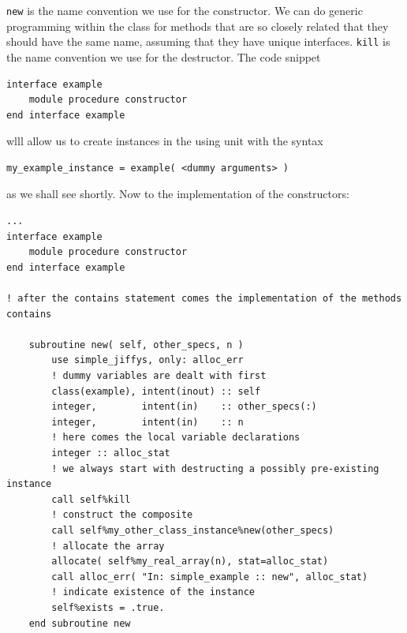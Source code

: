 \documentclass[a4paper,11pt]{article}
\begin{document}
\texttt{new} is the name convention we use for the constructor. We can do generic programming within the class for methods that are so closely related that they should have the same name, assuming that they have unique interfaces. \texttt{kill} is the name convention we use for the destructor. The  code snippet
\begin{verbatim}
interface example
    module procedure constructor
end interface example
\end{verbatim}
wlll allow us to create instances in the using unit with the syntax
\begin{verbatim}
my_example_instance = example( <dummy arguments> )
\end{verbatim}
as we shall see shortly. Now to the implementation of the constructors:
\begin{verbatim}
...
interface example
    module procedure constructor
end interface example

! after the contains statement comes the implementation of the methods
contains

    subroutine new( self, other_specs, n )
        use simple_jiffys, only: alloc_err
        ! dummy variables are dealt with first
        class(example), intent(inout) :: self
        integer,        intent(in)    :: other_specs(:)
        integer,        intent(in)    :: n
        ! here comes the local variable declarations
        integer :: alloc_stat
        ! we always start with destructing a possibly pre-existing instance
        call self%kill
        ! construct the composite
        call self%my_other_class_instance%new(other_specs)
        ! allocate the array
        allocate( self%my_real_array(n), stat=alloc_stat)
        call alloc_err( "In: simple_example :: new", alloc_stat)
        ! indicate existence of the instance
        self%exists = .true.
    end subroutine new
\end{verbatim}
\end{document}
